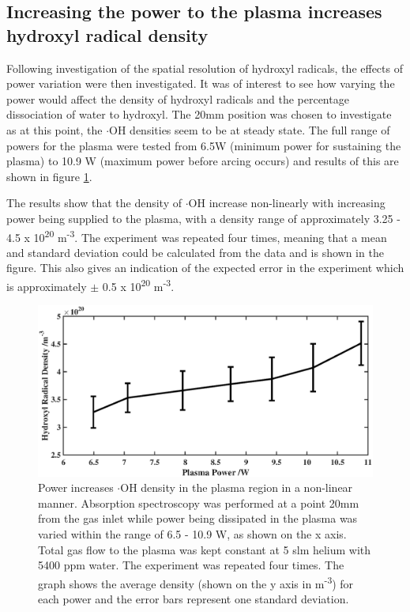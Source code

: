 \documentclass[11pt, oneside]{article}   	%
\begin{document}
\subsection{Increasing the power to the plasma increases hydroxyl radical density}

Following investigation of the spatial resolution of hydroxyl radicals, the effects of power variation were then investigated.
It was of interest to see how varying the power would affect the density of hydroxyl radicals and the percentage dissociation of water to hydroxyl.
The 20mm position was chosen to investigate as at this point, the $\cdot$OH densities seem to be at steady state. 
The full range of powers for the plasma were tested from 6.5W (minimum power for sustaining the plasma) to 10.9 W (maximum power before arcing occurs) and results of this are shown in figure \ref{fig:PowerVariation}.

The results show that the density of $\cdot$OH increase non-linearly with increasing power being supplied to the plasma, with a density range of approximately 3.25 - 4.5 x 10\textsuperscript{20} m\textsuperscript{-3}.
The experiment was repeated four times, meaning that a mean and standard deviation could be calculated from the data and is shown in the figure. 
This also gives an indication of the expected error in the experiment which is approximately $\pm$ 0.5 x 10\textsuperscript{20} m\textsuperscript{-3}.

\begin{figure}
    \centering
    \includegraphics[width=\textwidth]{Figures/PowerVariationBig.eps}
    \caption{Power increases $\cdot$OH density in the plasma region in a non-linear manner. Absorption spectroscopy was performed at a point 20mm from the gas inlet while power being dissipated in the plasma was varied within the range of 6.5 - 10.9 W, as shown on the x axis. Total gas flow to the plasma was kept constant at 5 slm helium with 5400 ppm water. The experiment was repeated four times. The graph shows the average density (shown on the y axis in m\textsuperscript{-3}) for each power and the error bars represent one standard deviation.}
    \label{fig:PowerVariation}
\end{figure}
\end{document}
